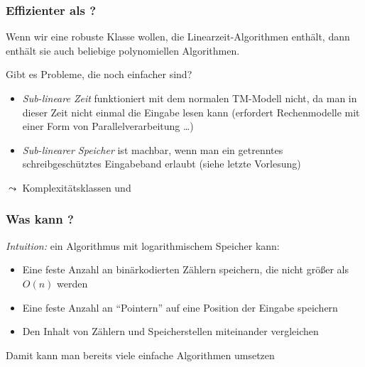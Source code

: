 \documentclass[onlymath]{beamer}
\begin{document}
\begin{frame}\frametitle{Effizienter als ?}

Wenn wir eine robuste Klasse wollen, die Linearzeit-Algorithmen enthält, dann enthält sie auch beliebige polynomiellen Algorithmen.\bigskip

\alert{Gibt es Probleme, die noch einfacher sind?}
\smallskip\pause

\begin{itemize}
\item \emph{Sub-lineare Zeit} funktioniert mit dem normalen TM-Modell nicht, da man
in dieser Zeit nicht einmal die Eingabe lesen kann {\tiny (erfordert Rechenmodelle mit einer Form von Parallelverarbeitung \ldots)}
\item \emph{Sub-linearer Speicher} ist machbar, wenn man ein getrenntes schreibgeschütztes Eingabeband erlaubt (siehe letzte Vorlesung)
\end{itemize}
$\leadsto$ Komplexitätsklassen  und 

\end{frame}

\begin{frame}\frametitle{Was kann ?}

\emph{Intuition:} ein Algorithmus mit logarithmischem Speicher kann:
\begin{itemize}
\item Eine feste Anzahl an binärkodierten Zählern speichern, die nicht größer als $O(n)$ werden
\item Eine feste Anzahl an "`Pointern"' auf eine Position der Eingabe speichern
\item Den Inhalt von Zählern und Speicherstellen miteinander vergleichen
\end{itemize}

Damit kann man bereits viele einfache Algorithmen umsetzen\pause


\end{frame}
\end{document}
